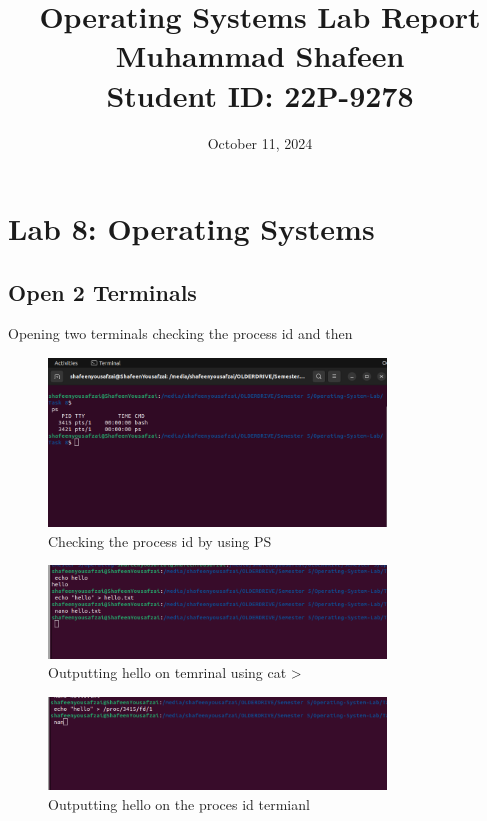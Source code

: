 \documentclass[12pt]{article}
\title{
    \vspace{-2cm} %
    \LARGE{\textbf{Operating Systems Lab Report}} \\
    \vspace{0.5cm}
    \Huge{Muhammad Shafeen} \\
    \Large{Student ID: 22P-9278}
}
\date{October 11, 2024} %
\begin{document}
\maketitle
\thispagestyle{fancy} %

\section*{Lab 8: Operating Systems}
\subsection{Open 2 Terminals}
Opening two terminals checking the process id and then 
\begin{figure}[H]
    \centering
    \includegraphics[width=0.8\textwidth]{Screenshot from 2024-10-11 08-17-18.png}
    \caption{Checking the process id by using PS}
    \label{fig:enter-label}
\end{figure}

\begin{figure}[H]
    \centering
    \includegraphics[width=0.8\textwidth]{Screenshot from 2024-10-11 08-17-34.png}
    \caption{Outputting hello on temrinal using cat >}
    \label{fig:enter-label}
\end{figure}

\begin{figure}[H]
    \centering
    \includegraphics[width=0.8\textwidth]{Screenshot from 2024-10-11 08-19-57.png}
    \caption{Outputting hello on the proces id termianl}
    \label{fig:enter-label}
\end{figure}
\end{document}
